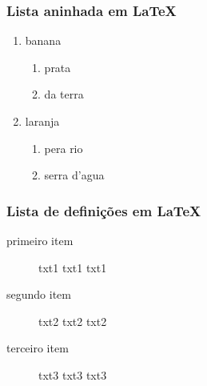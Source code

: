 \begin{frame}[fragile]
\frametitle{Lista aninhada em \LaTeX{}}
\begin{LTXexample}
\begin{enumerate}
\item banana
    \begin{enumerate}
    \item prata
    \item da terra
    \end{enumerate}
\item laranja
    \begin{enumerate}
    \item pera rio
    \item serra d'agua
    \end{enumerate}
\end{enumerate}
\end{LTXexample}
\end{frame}

\begin{frame}[fragile]
\frametitle{Lista de definições em \LaTeX{}}
\begin{LTXexample}
\begin{description}
 \item[primeiro item] txt1 txt1 txt1
 \item[segundo item] txt2 txt2 txt2
 \item[terceiro item] txt3 txt3 txt3
\end{description}
\end{LTXexample}
\end{frame}

